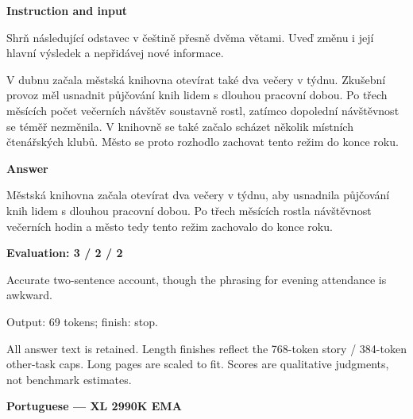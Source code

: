 \documentclass[10pt]{article}
\begin{document}
{\begin{minipage}{\textwidth}
\textbf{Instruction and input}\par Shrň následující odstavec v češtině přesně dvěma větami. Uveď změnu i její hlavní výsledek a nepřidávej nové informace.
\par\smallskip
V dubnu začala městská knihovna otevírat také dva večery v týdnu. Zkušební provoz měl usnadnit půjčování knih lidem s dlouhou pracovní dobou. Po třech měsících počet večerních návštěv soustavně rostl, zatímco dopolední návštěvnost se téměř nezměnila. V knihovně se také začalo scházet několik místních čtenářských klubů. Město se proto rozhodlo zachovat tento režim do konce roku.\par\smallskip
\textbf{Answer}\par Městská knihovna začala otevírat dva večery v týdnu, aby usnadnila půjčování knih lidem s dlouhou pracovní dobou. Po třech měsících rostla návštěvnost večerních hodin a město tedy tento režim zachovalo do konce roku.\par\smallskip
\textbf{Evaluation: 3 / 2 / 2}\par Accurate two-sentence account, though the phrasing for evening attendance is awkward.
\par {\color{gray} Output: 69 tokens; finish: stop.}\par
\medskip\footnotesize All answer text is retained. Length finishes reflect the 768-token story / 384-token other-task caps. Long pages are scaled to fit. Scores are qualitative judgments, not benchmark estimates.
\end{minipage}}%
\noindent\ifdim\dimexpr\ht\languagepage+\dp\languagepage\relax>0.93\textheight%
\resizebox*{!}{0.93\textheight}{\usebox{\languagepage}}%
\else\usebox{\languagepage}\fi%
\clearpage
{\Large\bfseries Portuguese --- XL 2990K EMA}\par\smallskip
\end{document}
